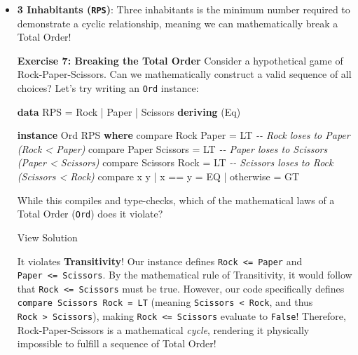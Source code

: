 \documentclass[
]{article}
\newenvironment{Shaded}{}{}
\newcommand{\CommentTok}[1]{\textcolor[rgb]{0.38,0.63,0.69}{\textit{#1}}}
\newcommand{\DataTypeTok}[1]{\textcolor[rgb]{0.56,0.13,0.00}{#1}}
\newcommand{\FunctionTok}[1]{\textcolor[rgb]{0.02,0.16,0.49}{#1}}
\newcommand{\KeywordTok}[1]{\textcolor[rgb]{0.00,0.44,0.13}{\textbf{#1}}}
\newcommand{\NormalTok}[1]{#1}
\newcommand{\OperatorTok}[1]{\textcolor[rgb]{0.40,0.40,0.40}{#1}}
\newcommand{\OtherTok}[1]{\textcolor[rgb]{0.00,0.44,0.13}{#1}}
\begin{document}
\begin{itemize}
\item
  \textbf{3 Inhabitants (\texttt{RPS})}: Three inhabitants is the
  minimum number required to demonstrate a cyclic relationship, meaning
  we can mathematically break a Total Order!

  \textbf{Exercise 7: Breaking the Total Order} Consider a hypothetical
  game of Rock-Paper-Scissors. Can we mathematically construct a valid
  sequence of all choices? Let's try writing an \texttt{Ord} instance:

\begin{Shaded}
\begin{Highlighting}[]
\KeywordTok{data} \DataTypeTok{RPS} \OtherTok{=} \DataTypeTok{Rock} \OperatorTok{|} \DataTypeTok{Paper} \OperatorTok{|} \DataTypeTok{Scissors} \KeywordTok{deriving}\NormalTok{ (}\DataTypeTok{Eq}\NormalTok{)}

\KeywordTok{instance} \DataTypeTok{Ord} \DataTypeTok{RPS} \KeywordTok{where}
    \FunctionTok{compare} \DataTypeTok{Rock} \DataTypeTok{Paper} \OtherTok{=} \DataTypeTok{LT}     \CommentTok{{-}{-} Rock loses to Paper  (Rock \textless{} Paper)}
    \FunctionTok{compare} \DataTypeTok{Paper} \DataTypeTok{Scissors} \OtherTok{=} \DataTypeTok{LT} \CommentTok{{-}{-} Paper loses to Scissors (Paper \textless{} Scissors)}
    \FunctionTok{compare} \DataTypeTok{Scissors} \DataTypeTok{Rock} \OtherTok{=} \DataTypeTok{LT}  \CommentTok{{-}{-} Scissors loses to Rock (Scissors \textless{} Rock)}
    \FunctionTok{compare}\NormalTok{ x y }\OperatorTok{|}\NormalTok{ x }\OperatorTok{==}\NormalTok{ y    }\OtherTok{=} \DataTypeTok{EQ}
                \OperatorTok{|} \FunctionTok{otherwise} \OtherTok{=} \DataTypeTok{GT}
\end{Highlighting}
\end{Shaded}

  While this compiles and type-checks, which of the mathematical laws of
  a Total Order (\texttt{Ord}) does it violate?

  View Solution

  It violates \textbf{Transitivity}! Our instance defines
  \texttt{Rock\ \textless{}=\ Paper} and
  \texttt{Paper\ \textless{}=\ Scissors}. By the mathematical rule of
  Transitivity, it would follow that
  \texttt{Rock\ \textless{}=\ Scissors} must be true. However, our code
  specifically defines \texttt{compare\ Scissors\ Rock\ =\ LT} (meaning
  \texttt{Scissors\ \textless{}\ Rock}, and thus
  \texttt{Rock\ \textgreater{}\ Scissors}), making
  \texttt{Rock\ \textless{}=\ Scissors} evaluate to \texttt{False}!
  Therefore, Rock-Paper-Scissors is a mathematical \emph{cycle},
  rendering it physically impossible to fulfill a sequence of Total
  Order!


\end{itemize}
\end{document}
